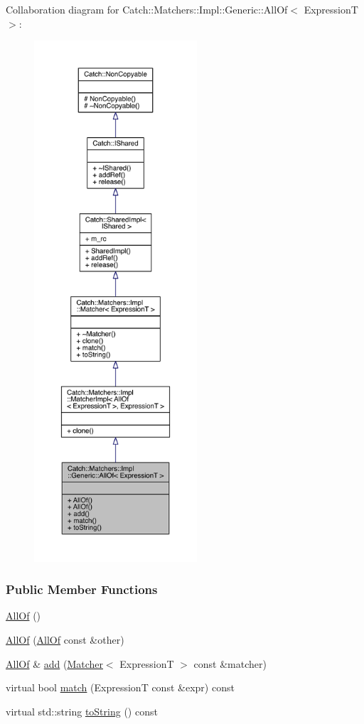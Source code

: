 Collaboration diagram for Catch\+:\+:Matchers\+:\+:Impl\+:\+:Generic\+:\+:All\+Of$<$ Expression\+T $>$\+:\nopagebreak
\begin{figure}[H]
\begin{center}
\leavevmode
\includegraphics[height=550pt]{a00343}
\end{center}
\end{figure}
\subsubsection*{Public Member Functions}
\begin{DoxyCompactItemize}
\item 
\hyperlink{a00001_a9dfcc2f0549114f3b50cc65a2e10c996}{All\+Of} ()
\item 
\hyperlink{a00001_a31f7c5e570e79bdf64064ee87c331a59}{All\+Of} (\hyperlink{a00001}{All\+Of} const \&other)
\item 
\hyperlink{a00001}{All\+Of} \& \hyperlink{a00001_a8c5cd1e494ab697076da418ee72ac297}{add} (\hyperlink{a00047}{Matcher}$<$ Expression\+T $>$ const \&matcher)
\item 
virtual bool \hyperlink{a00001_a04534d0ac9e089f4500c3c19054f11ce}{match} (Expression\+T const \&expr) const 
\item 
virtual std\+::string \hyperlink{a00001_a9febc1e67acbeff62a32bcbfdc0c8fab}{to\+String} () const 
\end{DoxyCompactItemize}
